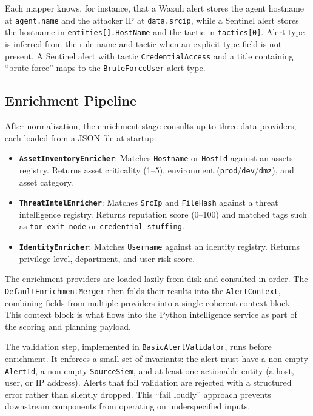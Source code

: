 Each mapper knows, for instance, that a Wazuh alert stores the agent hostname at \texttt{agent.name} and the attacker IP at \texttt{data.srcip}, while a Sentinel alert stores the hostname in \texttt{entities[].HostName} and the tactic in \texttt{tactics[0]}. Alert type is inferred from the rule name and tactic when an explicit type field is not present. A Sentinel alert with tactic \texttt{CredentialAccess} and a title containing ``brute force'' maps to the \texttt{BruteForceUser} alert type.

\subsection{Enrichment Pipeline}

After normalization, the enrichment stage consults up to three data providers, each loaded from a JSON file at startup:

\begin{itemize}
    \item \textbf{\texttt{AssetInventoryEnricher}}: Matches \texttt{Hostname} or \texttt{HostId} against an assets registry. Returns asset criticality (1--5), environment (\texttt{prod}/\texttt{dev}/\texttt{dmz}), and asset category.
    \item \textbf{\texttt{ThreatIntelEnricher}}: Matches \texttt{SrcIp} and \texttt{FileHash} against a threat intelligence registry. Returns reputation score (0--100) and matched tags such as \texttt{tor-exit-node} or \texttt{credential-stuffing}.
    \item \textbf{\texttt{IdentityEnricher}}: Matches \texttt{Username} against an identity registry. Returns privilege level, department, and user risk score.
\end{itemize}

The enrichment providers are loaded lazily from disk and consulted in order. The \texttt{DefaultEnrichmentMerger} then folds their results into the \texttt{AlertContext}, combining fields from multiple providers into a single coherent context block. This context block is what flows into the Python intelligence service as part of the scoring and planning payload.

The validation step, implemented in \texttt{BasicAlertValidator}, runs before enrichment. It enforces a small set of invariants: the alert must have a non-empty \texttt{AlertId}, a non-empty \texttt{SourceSiem}, and at least one actionable entity (a host, user, or IP address). Alerts that fail validation are rejected with a structured error rather than silently dropped. This ``fail loudly'' approach prevents downstream components from operating on underspecified inputs.

